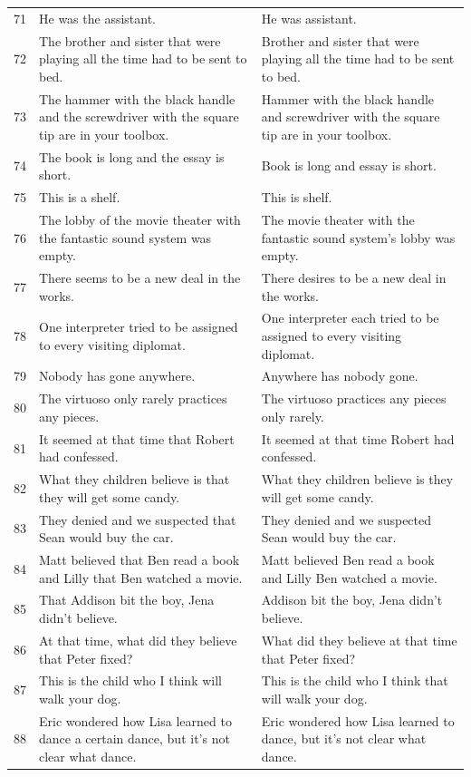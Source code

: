 \documentclass[doc]{apa6}
\begin{document}
\begin{small}
\begin{longtable}{p{1cm} | p{8.5cm} | p{8.5cm}}
71 & He was the assistant. & He was assistant.\\
72 & The brother and sister that were playing all the time had to be sent to bed. & Brother and sister that were playing all the time had to be sent to bed.\\
73 & The hammer with the black handle and the screwdriver with the square tip are in your toolbox. & Hammer with the black handle and screwdriver with the square tip are in your toolbox.\\
74 & The book is long and the essay is short. & Book is long and essay is short.\\
75 & This is a shelf. & This is shelf.\\
76 & The lobby of the movie theater with the fantastic sound system was empty. & The movie theater with the fantastic sound system's lobby was empty.\\
77 & There seems to be a new deal in the works. & There desires to be a new deal in the works.\\
78 & One interpreter tried to be assigned to every visiting diplomat. & One interpreter each tried to be assigned to every visiting diplomat.\\
79 & Nobody has gone anywhere. & Anywhere has nobody gone.\\
80 & The virtuoso only rarely practices any pieces. & The virtuoso practices any pieces only rarely.\\
81 & It seemed at that time that Robert had confessed. & It seemed at that time Robert had confessed.\\
82 & What they children believe is that they will get some candy. & What they children believe is they will get some candy.\\
83 & They denied and we suspected that Sean would buy the car. & They denied and we suspected Sean would buy the car.\\
84 & Matt believed that Ben read a book and Lilly that Ben watched a movie. & Matt believed Ben read a book and Lilly Ben watched a movie.\\
85 & That Addison bit the boy, Jena didn't believe. & Addison bit the boy, Jena didn't believe.\\
86 & At that time, what did they believe that Peter fixed? & What did they believe at that time that Peter fixed?\\
87 & This is the child who I think will walk your dog. & This is the child who I think that will walk your dog.\\
88 & Eric wondered how Lisa learned to dance a certain dance, but it's not clear what dance. & Eric wondered how Lisa learned to dance, but it's not clear what dance.\\

\end{longtable}
\end{small}
\end{document}
